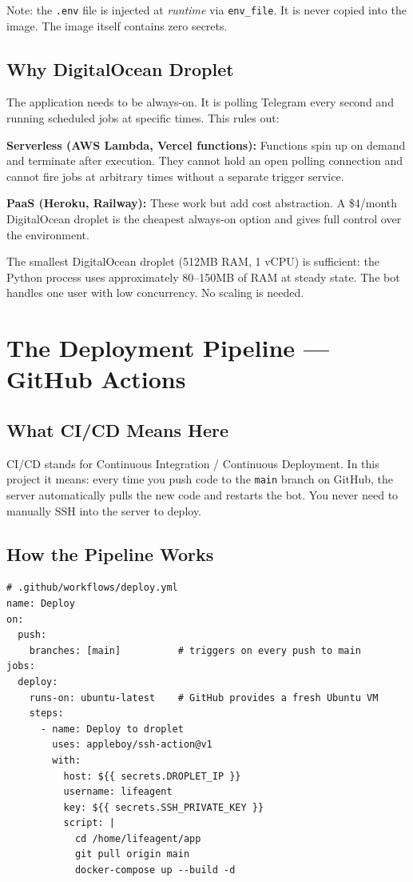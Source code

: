 \documentclass[12pt, a4paper]{article}
\begin{document}
Note: the \texttt{.env} file is injected at \textit{runtime} via \texttt{env\_file}. It is never copied into the image. The image itself contains zero secrets.

\subsection{Why DigitalOcean Droplet}

The application needs to be always-on. It is polling Telegram every second and running scheduled jobs at specific times. This rules out:

\textbf{Serverless (AWS Lambda, Vercel functions):} Functions spin up on demand and terminate after execution. They cannot hold an open polling connection and cannot fire jobs at arbitrary times without a separate trigger service.

\textbf{PaaS (Heroku, Railway):} These work but add cost abstraction. A \$4/month DigitalOcean droplet is the cheapest always-on option and gives full control over the environment.

The smallest DigitalOcean droplet (512MB RAM, 1 vCPU) is sufficient: the Python process uses approximately 80--150MB of RAM at steady state. The bot handles one user with low concurrency. No scaling is needed.

\section{The Deployment Pipeline --- GitHub Actions}

\subsection{What CI/CD Means Here}

CI/CD stands for Continuous Integration / Continuous Deployment. In this project it means: every time you push code to the \texttt{main} branch on GitHub, the server automatically pulls the new code and restarts the bot. You never need to manually SSH into the server to deploy.

\subsection{How the Pipeline Works}

\begin{lstlisting}
# .github/workflows/deploy.yml
name: Deploy
on:
  push:
    branches: [main]          # triggers on every push to main
jobs:
  deploy:
    runs-on: ubuntu-latest    # GitHub provides a fresh Ubuntu VM
    steps:
      - name: Deploy to droplet
        uses: appleboy/ssh-action@v1
        with:
          host: ${{ secrets.DROPLET_IP }}
          username: lifeagent
          key: ${{ secrets.SSH_PRIVATE_KEY }}
          script: |
            cd /home/lifeagent/app
            git pull origin main
            docker-compose up --build -d
\end{lstlisting}
\end{document}
